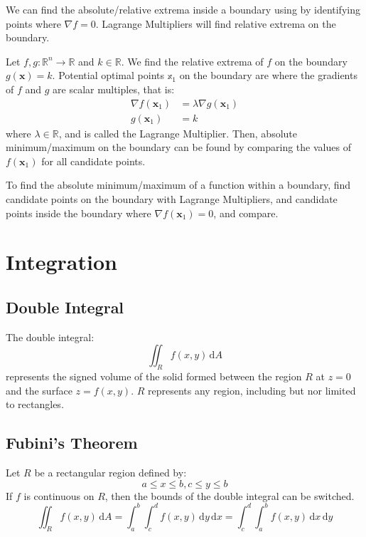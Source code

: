 \documentclass{article}
\begin{document}
We can find the absolute/relative extrema inside a boundary using by identifying points where $\nabla f=0$. Lagrange Multipliers will find relative extrema on the boundary.

Let $f,g:\mathbb R^n\to\mathbb R$ and $k\in\mathbb R$. We find the relative extrema of $f$ on the boundary $g(\mathbf x)=k$. Potential optimal points $\mathbb x_1$ on the boundary are where the gradients of $f$ and $g$ are scalar multiples, that is:
\begin{align*}
	\nabla f(\mathbf x_1)&=\lambda \nabla g(\mathbf x_1) \\
	g(\mathbf x_1)&=k
\end{align*}
where $\lambda\in\mathbb R$, and is called the Lagrange Multiplier. Then, absolute minimum/maximum on the boundary can be found by comparing the values of $f(\mathbf x_1)$ for all candidate points.

To find the absolute minimum/maximum of a function within a boundary, find candidate points on the boundary with Lagrange Multipliers, and candidate points inside the boundary where $\nabla f(\mathbf x_1)=0$, and compare.

\section{Integration}

\subsection{Double Integral}

The double integral:
\begin{equation*}
    \iint_R f(x,y)\,\mathrm{d}A
\end{equation*}
represents the signed volume of the solid formed between the region $R$ at $z=0$ and the surface $z=f(x,y)$. $R$ represents any region, including but nor limited to rectangles.

\subsection{Fubini's Theorem}

Let $R$ be a rectangular region defined by:
\begin{equation*}
    a\leq x\leq b, c\leq y\leq b
\end{equation*}
If $f$ is continuous on $R$, then the bounds of the double integral can be switched.
\begin{equation*}
    \iint_R f(x,y) \,\mathrm{d}A
    =\int_{a}^{b}\int_{c}^{d}f(x,y)\,\mathrm{d}y\,\mathrm{d}x
    =\int_{c}^{d}\int_{a}^{b}f(x,y)\,\mathrm{d}x\,\mathrm{d}y
\end{equation*}
\end{document}
